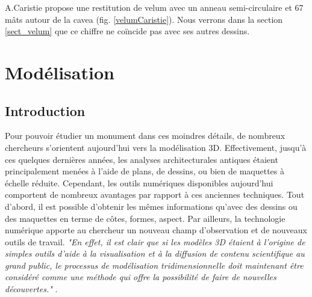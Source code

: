 		A.Caristie propose une restitution de \gls{velum} avec un anneau semi-circulaire et 67 mâts autour de la \gls{cavea} (fig. \ref{velumCaristie}). Nous verrons dans la section \ref{sect_velum} que ce chiffre ne coïncide pas avec ses autres dessins.
		














\chapter{Modélisation}
		\minitoc
		\newpage
		
		\section{Introduction}
		Pour pouvoir étudier un monument dans ces moindres détails, de nombreux chercheurs s'orientent aujourd'hui vers la modélisation 3D. Effectivement, jusqu'à ces quelques dernières années, les analyses architecturales antiques étaient principalement menées à l'aide de plans, de dessins, ou bien de maquettes à échelle réduite. Cependant, les outils numériques disponibles aujourd'hui comportent de nombreux avantages par rapport à ces anciennes techniques. Tout d'abord, il est possible d'obtenir les mêmes informations qu'avec des dessins ou des maquettes en terme de côtes, formes, aspect. Par ailleurs, la technologie numérique apporte au chercheur un nouveau champ d'observation et de nouveaux outils de travail. \textit{"En effet, il est clair que si les modèles 3D étaient à l’origine de simples outils d’aide à la visualisation et à la diffusion de contenu scientifique au grand public, le processus de modélisation tridimensionnelle doit maintenant être considéré comme une méthode qui offre la possibilité de faire de nouvelles découvertes."} \cite[p. 246]{rocheleau}.
		
